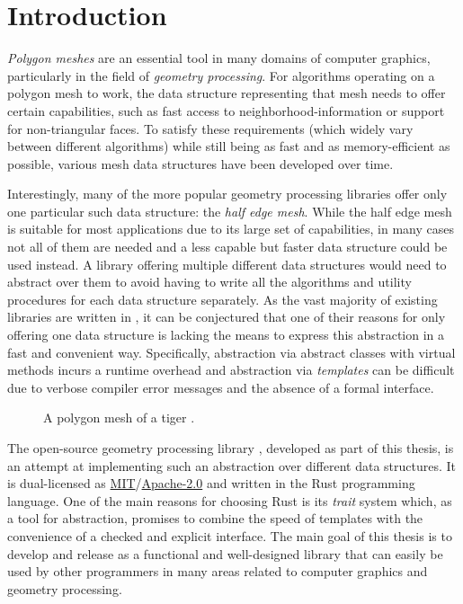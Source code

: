 \chapter{Introduction}

\emph{Polygon meshes} are an essential tool in many domains of computer graphics, particularly in the field of \emph{geometry processing}.
For algorithms operating on a polygon mesh to work, the data structure representing that mesh needs to offer certain capabilities, such as fast access to neighborhood-information or support for non-triangular faces.
To satisfy these requirements (which widely vary between different algorithms) while still being as fast and as memory-efficient as possible, various mesh data structures have been developed over time.

Interestingly, many of the more popular geometry processing libraries offer only one particular such data structure: the \emph{half edge mesh}.
While the half edge mesh is suitable for most applications due to its large set of capabilities, in many cases not all of them are needed and a less capable but faster data structure could be used instead.
A library offering multiple different data structures would need to abstract over them to avoid having to write all the algorithms and utility procedures for each data structure separately.
As the vast majority of existing libraries are written in \cpp, it can be conjectured that one of their reasons for only offering one data structure is \cpp lacking the means to express this abstraction in a fast and convenient way.
Specifically, abstraction via abstract classes with virtual methods incurs a runtime overhead and abstraction via \emph{\cpp templates} can be difficult due to verbose compiler error messages and the absence of a formal interface.

\vspace{5mm}

\begin{figure}[h]
  \centering
  
  \caption{A polygon mesh of a tiger \cite{tigermodel}.}
\end{figure}

\vspace{1cm}

The open-source geometry processing library , developed as part of this thesis, is an attempt at implementing such an abstraction over different data structures.
It is dual-licensed as \hyperlink{mit}{MIT}/\hyperlink{apache2}{Apache-2.0} and written in the Rust programming language.
One of the main reasons for choosing Rust is its \emph{trait} system which, as a tool for abstraction, promises to combine the speed of \cpp templates with the convenience of a checked and explicit interface.
The main goal of this thesis is to develop and release  as a functional and well-designed library that can easily be used by other programmers in many areas related to computer graphics and geometry processing.

